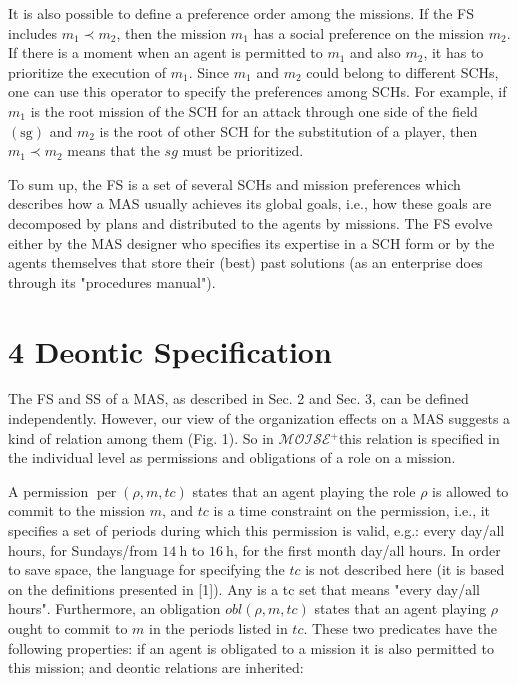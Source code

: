 \documentclass[10pt]{article}
\begin{document}
It is also possible to define a preference order among the missions. If the FS includes $m_{1} \prec m_{2}$, then the mission $m_{1}$ has a social preference on the mission $m_{2}$. If there is a moment when an agent is permitted to $m_{1}$ and also $m_{2}$, it has to prioritize the execution of $m_{1}$. Since $m_{1}$ and $m_{2}$ could belong to different SCHs, one can use this operator to specify the preferences among SCHs. For example, if $m_{1}$ is the root mission of the SCH for an attack through one side of the field $(\mathrm{sg})$ and $m_{2}$ is the root of other SCH for the substitution of a player, then $m_{1} \prec m_{2}$ means that the $s g$ must be prioritized.

To sum up, the FS is a set of several SCHs and mission preferences which describes how a MAS usually achieves its global goals, i.e., how these goals are decomposed by plans and distributed to the agents by missions. The FS evolve either by the MAS designer who specifies its expertise in a SCH form or by the agents themselves that store their (best) past solutions (as an enterprise does through its "procedures manual").

\section*{4 Deontic Specification}
The FS and SS of a MAS, as described in Sec. 2 and Sec. 3, can be defined independently. However, our view of the organization effects on a MAS suggests a kind of relation among them (Fig. 1). So in $\mathcal{M O I S E}{ }^{+}$this relation is specified in the individual level as permissions and obligations of a role on a mission.

A permission $\operatorname{per}(\rho, m, t c)$ states that an agent playing the role $\rho$ is allowed to commit to the mission $m$, and $t c$ is a time constraint on the permission, i.e., it specifies a set of periods during which this permission is valid, e.g.: every day/all hours, for Sundays/from $14 \mathrm{~h}$ to $16 \mathrm{~h}$, for the first month day/all hours. In order to save space, the language for specifying the $t c$ is not described here (it is based on the definitions presented in [1]). Any is a tc set that means "every day/all hours". Furthermore, an obligation $o b l(\rho, m, t c)$ states that an agent playing $\rho$ ought to commit to $m$ in the periods listed in $t c$. These two predicates have the following properties: if an agent is obligated to a mission it is also permitted to this mission; and deontic relations are inherited:
\end{document}
